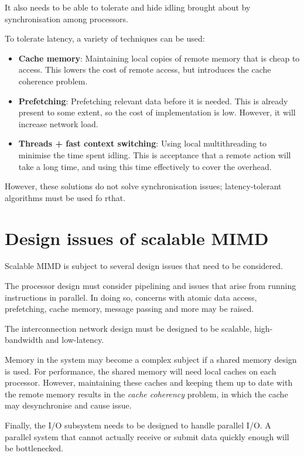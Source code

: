 It also needs to be able to tolerate and hide idling brought about by synchronisation among processors.

To tolerate latency, a variety of techniques can be used: \begin{itemize}
\item \textbf{Cache memory}: Maintaining local copies of remote memory that is cheap to access. This lowers the cost of remote access, but introduces the cache coherence problem.
\item \textbf{Prefetching}: Prefetching relevant data before it is needed. This is already present to some extent, so the cost of implementation is low. However, it will increase network load.
\item \textbf{Threads + fast context switching}: Using local multithreading to minimise the time spent idling. This is acceptance that a remote action will take a long time, and using this time effectively to cover the overhead.
\end{itemize}
However, these solutions do not solve synchronisation issues; latency-tolerant algorithms must be used fo rthat.

\section{Design issues of scalable MIMD}
Scalable MIMD is subject to several design issues that need to be considered.

The processor design must consider pipelining and issues that arise from running instructions in parallel. In doing so, concerns with atomic data access, prefetching, cache memory, message passing and more may be raised.

The interconnection network design must be designed to be scalable, high-bandwidth and low-latency.

Memory in the system may become a complex subject if a shared memory design is used. For performance, the shared memory will need local caches on each processor. However, maintaining these caches and keeping them up to date with the remote memory results in the \textit{cache coherency} problem, in which the cache may desynchronise and cause issue.

Finally, the I/O subsystem needs to be designed to handle parallel I/O. A parallel system that cannot actually receive or submit data quickly enough will be bottlenecked.